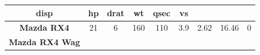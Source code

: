 \documentclass[12pt,oneside]{reedthesis}
\theoremstyle{definition}
\theoremstyle{definition}
\theoremstyle{definition}
\theoremstyle{remark}
\begin{document}
\begin{longtable}[]{@{}ccccccccc@{}}
\begin{minipage}[b]{0.07\columnwidth}
disp\strut
\end{minipage} & \begin{minipage}[b]{0.06\columnwidth}\centering\strut
hp\strut
\end{minipage} & \begin{minipage}[b]{0.07\columnwidth}\centering\strut
drat\strut
\end{minipage} & \begin{minipage}[b]{0.08\columnwidth}\centering\strut
wt\strut
\end{minipage} & \begin{minipage}[b]{0.08\columnwidth}\centering\strut
qsec\strut
\end{minipage} & \begin{minipage}[b]{0.04\columnwidth}\centering\strut
vs\strut
\end{minipage}\tabularnewline
\midrule
\endhead
\begin{minipage}[t]{0.24\columnwidth}\centering\strut
\textbf{Mazda RX4}\strut
\end{minipage} & \begin{minipage}[t]{0.07\columnwidth}\centering\strut
21\strut
\end{minipage} & \begin{minipage}[t]{0.06\columnwidth}\centering\strut
6\strut
\end{minipage} & \begin{minipage}[t]{0.07\columnwidth}\centering\strut
160\strut
\end{minipage} & \begin{minipage}[t]{0.06\columnwidth}\centering\strut
110\strut
\end{minipage} & \begin{minipage}[t]{0.07\columnwidth}\centering\strut
3.9\strut
\end{minipage} & \begin{minipage}[t]{0.08\columnwidth}\centering\strut
2.62\strut
\end{minipage} & \begin{minipage}[t]{0.08\columnwidth}\centering\strut
16.46\strut
\end{minipage} & \begin{minipage}[t]{0.04\columnwidth}\centering\strut
0\strut
\end{minipage}\tabularnewline
\begin{minipage}[t]{0.24\columnwidth}\centering\strut
\textbf{Mazda RX4 Wag}\strut
\end{minipage} & \begin{minipage}[t]{0.07\columnwidth}\centering\strut

\end{minipage}
\end{longtable}
\end{document}
